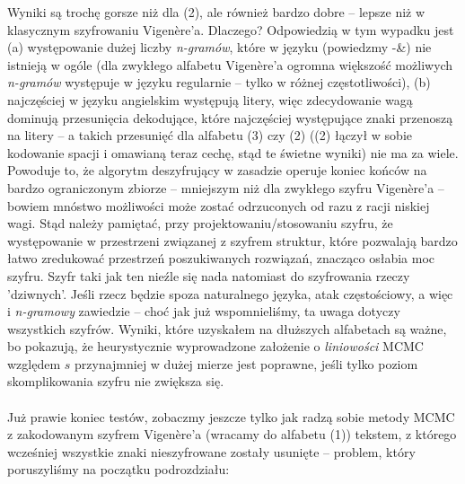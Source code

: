 \documentclass[a4paper]{article}
\theoremstyle{defn}
\theoremstyle{theorem}
\theoremstyle{lemma}
\theoremstyle{cor}
\theoremstyle{fact}
\begin{document}
Wyniki są trochę gorsze niż dla (2), ale również bardzo dobre – lepsze niż w klasycznym szyfrowaniu Vigenère'a. Dlaczego? Odpowiedzią w tym wypadku jest (a) występowanie dużej liczby \textit{n-gramów}, które w języku (powiedzmy -\&) nie istnieją w ogóle (dla zwykłego alfabetu Vigenère'a ogromna większość możliwych \textit{n-gramów} występuje w języku regularnie – tylko w różnej częstotliwości), (b) najczęściej w języku angielskim występują litery, więc zdecydowanie wagą dominują przesunięcia dekodujące, które najczęściej występujące znaki przenoszą na litery – a takich przesunięć dla alfabetu (3) czy (2) ((2) łączył w sobie kodowanie spacji i omawianą teraz cechę, stąd te świetne wyniki) nie ma za wiele. Powoduje to, że algorytm deszyfrujący w zasadzie operuje koniec końców na bardzo ograniczonym zbiorze – mniejszym niż dla zwykłego szyfru Vigenère'a – bowiem mnóstwo możliwości może zostać odrzuconych od razu z racji niskiej wagi. Stąd należy pamiętać, przy projektowaniu/stosowaniu szyfru, że występowanie w przestrzeni związanej z szyfrem struktur, które pozwalają bardzo łatwo zredukować przestrzeń poszukiwanych rozwiązań, znacząco osłabia moc szyfru. Szyfr taki jak ten nieźle się nada natomiast do szyfrowania rzeczy 'dziwnych'. Jeśli rzecz będzie spoza naturalnego języka, atak częstościowy, a więc i \textit{n-gramowy} zawiedzie – choć jak już wspomnieliśmy, ta uwaga dotyczy wszystkich szyfrów. Wyniki, które uzyskałem na dłuższych alfabetach są ważne, bo pokazują, że heurystycznie wyprowadzone założenie o \textit{liniowości} MCMC względem $s$ przynajmniej w dużej mierze jest poprawne, jeśli tylko poziom skomplikowania szyfru nie zwiększa się.\\\\
Już prawie koniec testów, zobaczmy jeszcze tylko jak radzą sobie metody MCMC z zakodowanym szyfrem Vigenère'a (wracamy do alfabetu (1)) tekstem, z którego wcześniej wszystkie znaki nieszyfrowane zostały usunięte – problem, który poruszyliśmy na początku podrozdziału:\\
\end{document}
